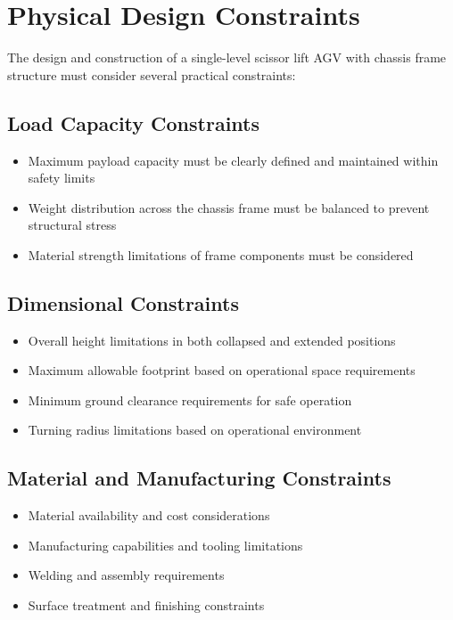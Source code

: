\documentclass[../../main]{subfiles}
\begin{document}
\section{Physical Design Constraints} %

The design and construction of a single-level scissor lift AGV with
chassis frame structure must consider several practical constraints:

\subsection{Load Capacity Constraints}

\begin{itemize}
\item
  Maximum payload capacity must be clearly defined and maintained within
  safety limits
\item
  Weight distribution across the chassis frame must be balanced to
  prevent structural stress
\item
  Material strength limitations of frame components must be considered
\end{itemize}

\subsection{Dimensional Constraints}

\begin{itemize}
\item
  Overall height limitations in both collapsed and extended positions
\item
  Maximum allowable footprint based on operational space requirements
\item
  Minimum ground clearance requirements for safe operation
\item
  Turning radius limitations based on operational environment
\end{itemize}

\subsection{Material and Manufacturing Constraints}

\begin{itemize}
\item
  Material availability and cost considerations
\item
  Manufacturing capabilities and tooling limitations
\item
  Welding and assembly requirements
\item
  Surface treatment and finishing constraints
\end{itemize}
\end{document}
